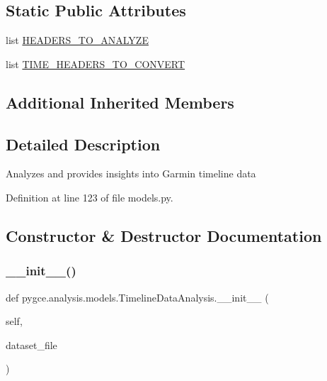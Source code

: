 \subsection*{Static Public Attributes}
\begin{DoxyCompactItemize}
\item 
list \hyperlink{classpygce_1_1analysis_1_1models_1_1_timeline_data_analysis_abc835b2b9b9d8555a2b49e8534782021}{H\+E\+A\+D\+E\+R\+S\+\_\+\+T\+O\+\_\+\+A\+N\+A\+L\+Y\+ZE}
\item 
list \hyperlink{classpygce_1_1analysis_1_1models_1_1_timeline_data_analysis_afaebf4ce7e847ff4c32a7b9b799fd94d}{T\+I\+M\+E\+\_\+\+H\+E\+A\+D\+E\+R\+S\+\_\+\+T\+O\+\_\+\+C\+O\+N\+V\+E\+RT}
\end{DoxyCompactItemize}
\subsection*{Additional Inherited Members}


\subsection{Detailed Description}
\begin{DoxyVerb}Analyzes and provides insights into Garmin timeline data \end{DoxyVerb}
 

Definition at line 123 of file models.\+py.



\subsection{Constructor \& Destructor Documentation}
\mbox{\label{classpygce_1_1analysis_1_1models_1_1_timeline_data_analysis_a7fccb7531cafe3b618ad7026db2d3b53}} 
\subsubsection{\texorpdfstring{\+\_\+\+\_\+init\+\_\+\+\_\+()}{\_\_init\_\_()}}
{\footnotesize\ttfamily def pygce.\+analysis.\+models.\+Timeline\+Data\+Analysis.\+\_\+\+\_\+init\+\_\+\+\_\+ (\begin{DoxyParamCaption}\item[{}]{self,  }\item[{}]{dataset\+\_\+file }\end{DoxyParamCaption})}

